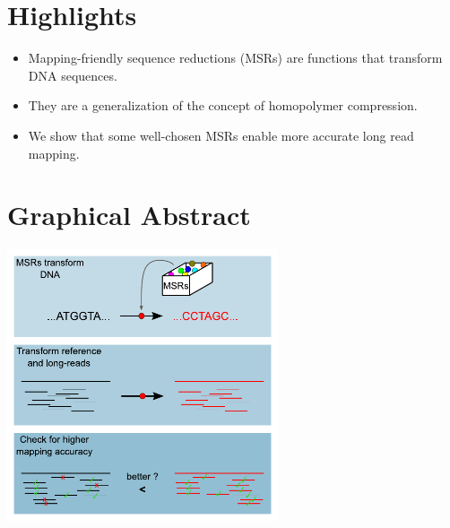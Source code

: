 \documentclass[
  11pt,
  twoside]{scrbook}
\begin{document}
\newcommand{\stirling}[2]{\bigg\{%
\begin{matrix}
    #1 \\
    #2
\end{matrix}
\bigg\} }
\newcommand{\comb}[2]{\bigg(
\begin{matrix}
    #1 \\
    #2
\end{matrix}
\bigg) }

\newcommand{\lmer}{$\ell$-mer\xspace}
\newcommand{\lmers}{$\ell$-mers\xspace}
\newcommand{\iscomp}{\textsc{IsComp}\xspace}
\newcommand{\rccore}{RC-core-insensitive\xspace}
\newcommand{\minimap}{\texttt{minimap2}\xspace}
\newcommand{\winnowmap}{\texttt{winnowmap2}\xspace}
\newcommand{\msr}[1]{MSR$_{\text{#1}}$}

\hypertarget{highlights}{%
\section*{Highlights}\label{highlights}}

\begin{itemize}
\item
  Mapping-friendly sequence reductions (MSRs) are functions that transform DNA sequences.
\item
  They are a generalization of the concept of homopolymer compression.
\item
  We show that some well-chosen MSRs enable more accurate long read mapping.
\end{itemize}

\hypertarget{graphical-abstract}{%
\section*{Graphical Abstract}\label{graphical-abstract}}

\includegraphics[width=0.6\textwidth]{figures/HPC-MSRs/abstract.pdf}
\end{document}
